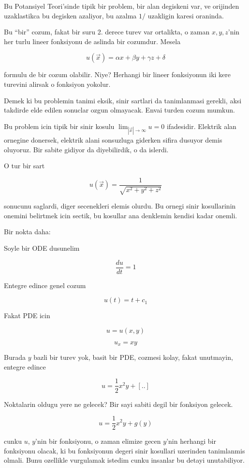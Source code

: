 \documentclass[12pt,fleqn]{article}
\begin{document}
Bu Potansiyel Teori'sinde tipik bir problem, bir alan degiskeni var, ve
orijinden uzaklastikca bu degisken azaliyor, bu azalma $1 / $ uzakligin
karesi oraninda. 

Bu ``bir'' cozum, fakat bir suru 2. derece turev var ortalikta, o zaman
$x,y,z$'nin her turlu lineer fonksiyonu de aslinda bir cozumdur. Mesela

\[ u(\vec{x}) = \alpha x + \beta y + \gamma z + \delta \]

formulu de bir cozum olabilir. Niye? Herhangi bir lineer fonksiyonun iki
kere turevini alirsak o fonksiyon yokolur. 

Demek ki bu problemin tanimi eksik, sinir sartlari da tanimlanmasi gerekli,
aksi takdirde elde edilen sonuclar ozgun olmayacak. Envai turden cozum
mumkun. 

Bu problem icin tipik bir sinir kosulu $\lim_{|\vec{x}|\to \infty} u = 0$
ifadesidir. Elektrik alan ornegine donersek, elektrik alani sonsuzluga
giderken sifira dusuyor demis oluyoruz. Bir sabite gidiyor da diyebilirdik,
o da islerdi. 

O tur bir sart 

\[ u(\vec{x}) = \frac{1}{\sqrt{x^2+y^2+z^2}} \]

sonucunu saglardi, diger secenekleri elemis olurdu. Bu ornegi sinir
kosullarinin onemini belirtmek icin sectik, bu kosullar ana denklemin
kendisi kadar onemli. 

Bir nokta daha:

Soyle bir ODE dusunelim

\[ \frac{du}{dt} = 1 \]

Entegre edince genel cozum

\[ u(t) = t + c_1 \]

Fakat PDE icin

\[ u = u(x,y) \]

\[ u_x = xy \]

Burada $y$ bazli bir turev yok, basit bir PDE, cozmesi kolay, fakat
unutmayin, entegre edince

\[ u = \frac{1}{2}x^2y + [..] \]

Noktalarin oldugu yere ne gelecek? Bir sayi sabiti degil bir fonksiyon
gelecek. 

\[ u = \frac{1}{2}x^2y + g(y) \]

cunku $u$, $y$'nin bir fonksiyonu, o zaman elimize gecen $y$'nin herhangi
bir fonksiyonu olacak, ki bu fonksiyonun degeri sinir kosullari uzerinden
tanimlanmis olmali. Bunu ozellikle vurgulamak istedim cunku insanlar bu
detayi unutabiliyor.
\end{document}
